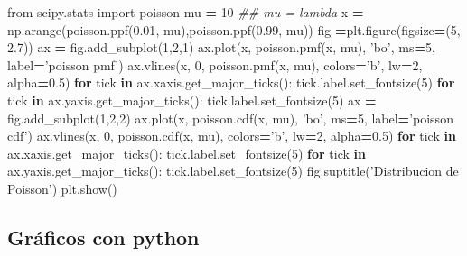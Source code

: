 \documentclass[]{book}
\newenvironment{Shaded}{\begin{snugshade}}{\end{snugshade}}
\newcommand{\CommentTok}[1]{\textcolor[rgb]{0.56,0.35,0.01}{\textit{#1}}}
\newcommand{\ControlFlowTok}[1]{\textcolor[rgb]{0.13,0.29,0.53}{\textbf{#1}}}
\newcommand{\DecValTok}[1]{\textcolor[rgb]{0.00,0.00,0.81}{#1}}
\newcommand{\FloatTok}[1]{\textcolor[rgb]{0.00,0.00,0.81}{#1}}
\newcommand{\ImportTok}[1]{#1}
\newcommand{\KeywordTok}[1]{\textcolor[rgb]{0.13,0.29,0.53}{\textbf{#1}}}
\newcommand{\NormalTok}[1]{#1}
\newcommand{\OperatorTok}[1]{\textcolor[rgb]{0.81,0.36,0.00}{\textbf{#1}}}
\newcommand{\StringTok}[1]{\textcolor[rgb]{0.31,0.60,0.02}{#1}}
\begin{document}
\begin{Shaded}
\begin{Highlighting}[]
\ImportTok{from}\NormalTok{ scipy.stats }\ImportTok{import}\NormalTok{ poisson}
\NormalTok{mu }\OperatorTok{=} \DecValTok{10} \CommentTok{## mu = lambda}
\NormalTok{x }\OperatorTok{=}\NormalTok{ np.arange(poisson.ppf(}\FloatTok{0.01}\NormalTok{, mu),poisson.ppf(}\FloatTok{0.99}\NormalTok{, mu))}
\NormalTok{fig }\OperatorTok{=}\NormalTok{plt.figure(figsize}\OperatorTok{=}\NormalTok{(}\DecValTok{5}\NormalTok{, }\FloatTok{2.7}\NormalTok{))}
\NormalTok{ax }\OperatorTok{=}\NormalTok{ fig.add_subplot(}\DecValTok{1}\NormalTok{,}\DecValTok{2}\NormalTok{,}\DecValTok{1}\NormalTok{)}
\NormalTok{ax.plot(x, poisson.pmf(x, mu), }\StringTok{'bo'}\NormalTok{, ms}\OperatorTok{=}\DecValTok{5}\NormalTok{, label}\OperatorTok{=}\StringTok{'poisson pmf'}\NormalTok{)}
\NormalTok{ax.vlines(x, }\DecValTok{0}\NormalTok{, poisson.pmf(x, mu), colors}\OperatorTok{=}\StringTok{'b'}\NormalTok{, lw}\OperatorTok{=}\DecValTok{2}\NormalTok{, alpha}\OperatorTok{=}\FloatTok{0.5}\NormalTok{)}
\ControlFlowTok{for}\NormalTok{ tick }\KeywordTok{in}\NormalTok{ ax.xaxis.get_major_ticks():}
\NormalTok{  tick.label.set_fontsize(}\DecValTok{5}\NormalTok{)}
\ControlFlowTok{for}\NormalTok{ tick }\KeywordTok{in}\NormalTok{ ax.yaxis.get_major_ticks():}
\NormalTok{  tick.label.set_fontsize(}\DecValTok{5}\NormalTok{) }
\NormalTok{ax }\OperatorTok{=}\NormalTok{ fig.add_subplot(}\DecValTok{1}\NormalTok{,}\DecValTok{2}\NormalTok{,}\DecValTok{2}\NormalTok{)}
\NormalTok{ax.plot(x, poisson.cdf(x, mu), }\StringTok{'bo'}\NormalTok{, ms}\OperatorTok{=}\DecValTok{5}\NormalTok{, label}\OperatorTok{=}\StringTok{'poisson cdf'}\NormalTok{)}
\NormalTok{ax.vlines(x, }\DecValTok{0}\NormalTok{, poisson.cdf(x, mu), colors}\OperatorTok{=}\StringTok{'b'}\NormalTok{, lw}\OperatorTok{=}\DecValTok{2}\NormalTok{, alpha}\OperatorTok{=}\FloatTok{0.5}\NormalTok{)}
\ControlFlowTok{for}\NormalTok{ tick }\KeywordTok{in}\NormalTok{ ax.xaxis.get_major_ticks():}
\NormalTok{  tick.label.set_fontsize(}\DecValTok{5}\NormalTok{)}
\ControlFlowTok{for}\NormalTok{ tick }\KeywordTok{in}\NormalTok{ ax.yaxis.get_major_ticks():}
\NormalTok{  tick.label.set_fontsize(}\DecValTok{5}\NormalTok{)}
\NormalTok{fig.suptitle(}\StringTok{'Distribucion de Poisson'}\NormalTok{)}
\NormalTok{plt.show()}
\end{Highlighting}
\end{Shaded}

\hypertarget{gruxe1ficos-con-python-3}{%
\subsection{Gráficos con python}\label{gruxe1ficos-con-python-3}}
\end{document}
